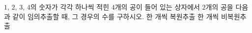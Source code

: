 $1$, $2$, $3$, $4$의 숫자가 각각 하나씩 적힌 $4$개의 공이 들어 있는 상자에서 $2$개의 공을 다음과 같이 임의추출할 때, 그 경우의 수를 구하시오.
 한 개씩 복원추출
 한 개씩 비복원추출
